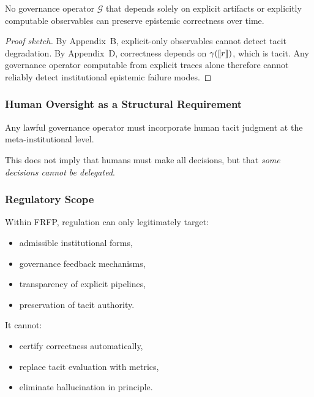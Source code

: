 \begin{theorem}
No governance operator $\mathcal{G}$ that depends solely on explicit artifacts
or explicitly computable observables can preserve epistemic correctness over
time.
\end{theorem}

\begin{proof}[Proof sketch]
By Appendix~B, explicit-only observables cannot detect tacit degradation.
By Appendix~D, correctness depends on $\gamma(\llbracket r \rrbracket)$, which is tacit.
Any governance operator computable from explicit traces alone therefore
cannot reliably detect institutional epistemic failure modes.
\end{proof}

\subsubsection{Human Oversight as a Structural Requirement}

\begin{corollary}
Any lawful governance operator must incorporate human tacit judgment at the
meta-institutional level.
\end{corollary}

This does not imply that humans must make all decisions, but that \emph{some
decisions cannot be delegated}.

\subsubsection{Regulatory Scope}

Within FRFP, regulation can only legitimately target:

\begin{itemize}
\item admissible institutional forms,
\item governance feedback mechanisms,
\item transparency of explicit pipelines,
\item preservation of tacit authority.
\end{itemize}

It cannot:
\begin{itemize}
\item certify correctness automatically,
\item replace tacit evaluation with metrics,
\item eliminate hallucination in principle.
\end{itemize}

